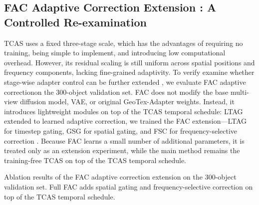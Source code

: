 \documentclass[times,twocolumn,final]{elsarticle}
\providecommand{\DIFadd}[1]{{\protect\color{red} \sf #1}} %
\providecommand{\DIFdel}[1]{{\protect\color{red} \scriptsize #1}} %
\providecommand{\DIFaddbegin}{} %
\providecommand{\DIFaddend}{} %
\providecommand{\DIFdelbegin}{} %
\providecommand{\DIFdelend}{} %
\providecommand{\DIFdelFL}[1]{\DIFdel{#1}} %
\newcommand{\DIFscaledelfig}{0.5}
\newlength{\DIFdelgraphicswidth} %
\newlength{\DIFdelgraphicsheight} %
\newcommand{\DIFaddincludegraphics}[2][]{{\color{red}\fbox{\DIFOincludegraphics[#1]{#2}}}} %
\newcommand{\DIFdelincludegraphics}[2][]{%
\sbox{\DIFdelgraphicsbox}{\DIFOincludegraphics[#1]{#2}}%
\settoboxwidth{\DIFdelgraphicswidth}{\DIFdelgraphicsbox} %
\settoboxtotalheight{\DIFdelgraphicsheight}{\DIFdelgraphicsbox} %
\scalebox{\DIFscaledelfig}{%
\parbox[b]{\DIFdelgraphicswidth}{\usebox{\DIFdelgraphicsbox}\\[-\baselineskip] \rule{\DIFdelgraphicswidth}{0em}}\llap{\resizebox{\DIFdelgraphicswidth}{\DIFdelgraphicsheight}{%
\setlength{\unitlength}{\DIFdelgraphicswidth}%
\begin{picture}(1,1)%
\thicklines\linethickness{2pt} %
{\color[rgb]{1,0,0}\put(0,0){\framebox(1,1){}}}%
{\color[rgb]{1,0,0}\put(0,0){\line( 1,1){1}}}%
{\color[rgb]{1,0,0}\put(0,1){\line(1,-1){1}}}%
\end{picture}%
}\hspace*{3pt}}} %
} %
\DeclareRobustCommand{\DIFaddbegin}{\DIFOaddbegin \let\includegraphics\DIFaddincludegraphics} %
\DeclareRobustCommand{\DIFaddend}{\DIFOaddend \let\includegraphics\DIFOincludegraphics} %
\DeclareRobustCommand{\DIFdelbegin}{\DIFOdelbegin \let\includegraphics\DIFdelincludegraphics} %
\DeclareRobustCommand{\DIFdelend}{\DIFOaddend \let\includegraphics\DIFOincludegraphics} %
\begin{document}
\DIFaddend \subsection{FAC Adaptive Correction Extension\DIFaddbegin \DIFadd{: A Controlled Re-examination}\DIFaddend }
\label{subsec:facexp}

TCAS uses a fixed three-stage scale, which has the advantages of requiring no training, being simple to implement, and introducing low computational overhead. However, its residual scaling is still uniform across spatial positions and frequency components, lacking fine-grained adaptivity. To \DIFdelbegin \DIFdel{verify }\DIFdelend \DIFaddbegin \DIFadd{examine }\DIFaddend whether stage-wise adapter control can be \DIFdelbegin \DIFdel{further extended , we evaluate FAC adaptive correctionon the 300-object validation set. FAC does not modify the base multi-view diffusion model, VAE, or original GeoTex-Adapter weights. Instead, it introduces lightweight modules on top of the TCAS temporal schedule: LTAG }\DIFdelend \DIFaddbegin \DIFadd{extended to learned adaptive correction, we trained the FAC extension---LTAG }\DIFaddend for timestep gating, GSG for spatial gating, and FSC for frequency-selective correction \DIFdelbegin \DIFdel{. Because FAC learns a small number of additional parameters, it is treated only as an extension experiment, while the main method remains the training-free TCAS }\DIFdelend \DIFaddbegin \DIFadd{on top of the TCAS temporal schedule}\DIFaddend . \DIFdelbegin %

{%
\DIFdelFL{Ablation results of the FAC adaptive correction extension on the 300-object validation set. Full FAC adds spatial gating and frequency-selective correction on top of the TCAS temporal schedule.}}
\end{document}
